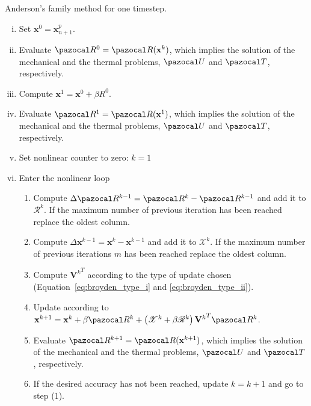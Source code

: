 \begin{framedbox}[htb]
  \caption{Anderson's family method for one timestep.}
  \label{box:broydens_method}
  \begin{center}
    \begin{minipage}{0.9\textwidth}
    \begin{enumerate}[(i)]
    \item Set \(\mathbf x^0 = \mathbf x_{n+ 1}^p\).
    \item Evaluate \(\pazocal R^0 = \pazocal R(\mathbf x^k)\), which implies the solution of the mechanical and the thermal problems, \(\pazocal U\) and \(\pazocal T\), respectively.
    \item Compute \(\mathbf x^1 = \mathbf x^0 + \beta R^0\).
    \item Evaluate \(\pazocal R^{1} = \pazocal R(\mathbf x^{1})\), which implies the solution of the mechanical and the thermal problems, \(\pazocal U\) and \(\pazocal T\), respectively.
    \item Set nonlinear counter to zero: \(k=1\)
    \item Enter the nonlinear loop
    \begin{enumerate}[(1)]
      \item Compute \(\Delta \pazocal R^{k-1} = \pazocal R^{k} - \pazocal R^{k-1}\) and add it to \(\mathscr R^k\). If the maximum number of previous iteration has been reached replace the oldest column.
      \item Compute \(\Delta \mathbf x^{k-1} = \mathbf x^{k} -\mathbf x^{k-1} \) and add it to \(\mathscr X^k\). If the maximum number of previous iterations \(m\) has been reached replace the oldest column.
      \item Compute \({\mathbf V^k}^T\) according to the type of update chosen (Equation~\eqref{eq:broyden_type_i} and \eqref{eq:broyden_type_ii}).
      \item Update according to \(\mathbf x^{k+1} = \mathbf x^k + \beta \pazocal R^k + \left(\mathscr X^k + \beta\mathscr R^k\right){\mathbf V^k}^T\pazocal R^k \).
      \item Evaluate \(\pazocal R^{k+1} = \pazocal R(\mathbf x^{k+1})\), which implies the solution of the mechanical and the thermal problems, \(\pazocal U\) and \(\pazocal T\), respectively.
      \item If the desired accuracy has not been reached, update \(k=k+1\) and go to step (1).
    \end{enumerate}
    \end{enumerate}
    \end{minipage}
  \end{center}
\end{framedbox}

